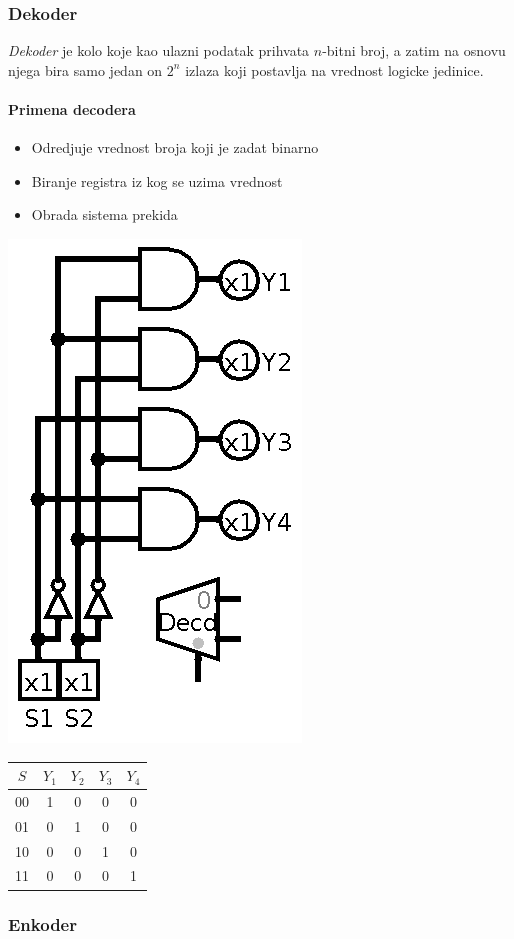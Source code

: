 \documentclass[12p,a4paper]{article}
\begin{document}
\begin{multicols}{2}
    \subsubsection{Dekoder}

    \emph{Dekoder} je kolo koje kao ulazni podatak prihvata $n$-bitni broj, a
    zatim na osnovu njega bira samo jedan on $2^n$ izlaza koji postavlja na 
    vrednost logicke jedinice.

    \paragraph{Primena decodera}
    \begin{itemize}
        \itemsep0em
        \item Odredjuje vrednost broja koji je zadat binarno
        \item Biranje registra iz kog se uzima vrednost
        \item Obrada sistema prekida
    \end{itemize}
    \includegraphics[width=0.4\columnwidth]{Figures/decoder.png}

    \begin{tabular}{*{5}{c}}
        $S$ & $Y_1$ & $Y_2$ & $Y_3$ & $Y_4$ \\
        \midrule
        00 & 1 & 0 & 0 & 0 \\
        01 & 0 & 1 & 0 & 0 \\
        10 & 0 & 0 & 1 & 0 \\
        11 & 0 & 0 & 0 & 1 \\
    \end{tabular}

    \subsubsection{Enkoder}


\end{multicols}
\end{document}

